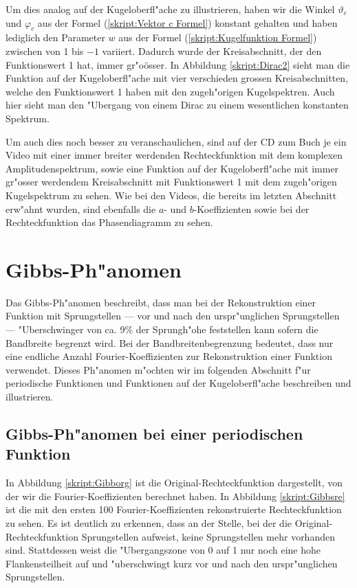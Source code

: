 \begin{refsection}
Um dies analog auf der Kugeloberfl"ache zu illustrieren, haben 
wir die Winkel $\vartheta_c$ und $\varphi_c$ aus der Formel 
(\ref{skript:Vektor c Formel}) konstant  gehalten und haben lediglich 
den Parameter $w$ aus der Formel (\ref{skript:Kugelfunktion Formel}) 
zwischen von 1 bis $-1$ variiert. 
Dadurch wurde der Kreisabschnitt, der den Funktionswert 1 hat, immer 
gr"oösser. 
In Abbildung \ref{skript:Dirac2} sieht man die Funktion auf der 
Kugeloberfl"ache mit vier verschieden grossen Kreisabschnitten, welche 
den Funktionswert 1 haben mit den zugeh"origen Kugelspektren. Auch
hier sieht man den "Ubergang von einem Dirac zu einem wesentlichen 
konstanten Spektrum.

Um auch dies noch besser zu veranschaulichen, sind auf der CD zum Buch 
je ein Video mit einer immer breiter werdenden Rechteckfunktion mit dem 
komplexen Amplitudenspektrum, sowie eine Funktion auf der 
Kugeloberfl"ache mit immer gr"osser werdendem Kreisabschnitt mit 
Funktionswert 1 mit dem zugeh"origen Kugelspektrum zu sehen. 
Wie bei den Videos, die bereits im letzten Abschnitt erw"ahnt wurden, 
sind ebenfalls die $a$- und $b$-Koeffizienten sowie bei der 
Rechteckfunktion das Phasendiagramm zu sehen.


\section{Gibbs-Ph"anomen}
Das Gibbs-Ph"anomen beschreibt, dass man bei der Rekonstruktion einer
Funktion mit Sprungstellen --- vor und nach den urspr"unglichen 
Sprungstellen --- "Uberschwinger von ca. 9\% der Sprungh"ohe feststellen 
kann sofern die Bandbreite begrenzt wird. 
Bei der Bandbreitenbegrenzung bedeutet, dass nur eine endliche Anzahl 
Fourier-Koeffizienten zur Rekonstruktion einer Funktion verwendet. 
Dieses Ph"anomen m"ochten wir im folgenden Abschnitt f"ur periodische 
Funktionen und Funktionen auf der Kugeloberfl"ache beschreiben und 
illustrieren.

\subsection{Gibbs-Ph"anomen bei einer periodischen Funktion}
In Abbildung \ref{skript:Gibborg} ist die Original-Rechteckfunktion 
dargestellt, von der wir die Fourier-Koeffizienten berechnet haben. 
In Abbildung \ref{skript:Gibbsre} ist die mit den ersten 100 
Fourier-Koeffizienten rekonstruierte Rechteckfunktion zu sehen. 
Es ist deutlich zu erkennen, dass an der Stelle, bei der die 
Original-Rechteckfunktion Sprungstellen aufweist, keine Sprungstellen 
mehr vorhanden sind. 
Stattdessen weist die "Ubergangszone von 0 auf 1 nur noch eine hohe 
Flankensteilheit auf und "uberschwingt kurz vor und nach den 
urspr"unglichen Sprungstellen.


\end{refsection}
